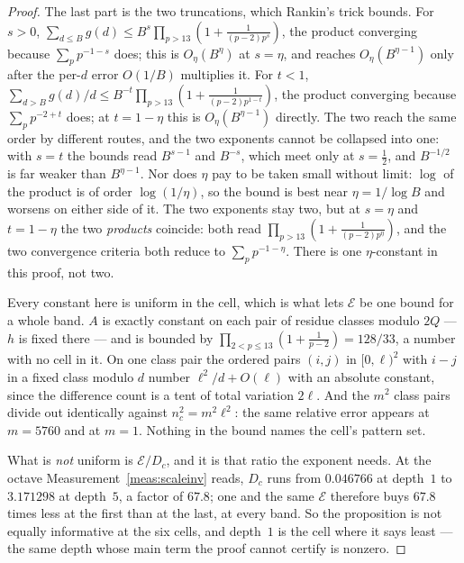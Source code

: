 \documentclass[11pt,a4paper]{article}
\theoremstyle{plain}
\theoremstyle{definition}
\theoremstyle{remark}
\begin{document}
\begin{proof}
The last part is the two truncations, which Rankin's trick bounds.
For $s>0$, $\sum_{d\le B}g(d)\le B^{s}\prod_{p>13}(1+\frac1{(p-2)p^{s}})$,
the product converging because $\sum_p p^{-1-s}$ does; this is
$O_\eta(B^{\eta})$ at $s=\eta$, and reaches $O_\eta(B^{\eta-1})$ only
after the per-$d$ error $O(1/B)$ multiplies it. For $t<1$,
$\sum_{d>B}g(d)/d\le B^{-t}\prod_{p>13}(1+\frac1{(p-2)p^{1-t}})$, the
product converging because $\sum_p p^{-2+t}$ does; at $t=1-\eta$ this
is $O_\eta(B^{\eta-1})$ directly. The two reach the same order by
different routes, and the two exponents cannot be collapsed into one:
with $s=t$ the bounds read $B^{s-1}$ and $B^{-s}$, which meet only at
$s=\tfrac12$, and $B^{-1/2}$ is far weaker than $B^{\eta-1}$. Nor does
$\eta$ pay to be taken small without limit: $\log$ of the product is
of order $\log(1\!/\!\eta)$, so the bound is best near
$\eta=1/\!\log B$ and worsens on either side of it. The two exponents
stay two, but at $s=\eta$ and $t=1-\eta$ the two \emph{products}
coincide: both read $\prod_{p>13}(1+\frac1{(p-2)p^{\eta}})$, and the
two convergence criteria both reduce to $\sum_p p^{-1-\eta}$. There is
one $\eta$-constant in this proof, not two.

Every constant here is uniform in the cell, which is what lets
$\mathcal E$ be one bound for a whole band. $A$ is exactly constant on
each pair of residue classes modulo $2Q$ --- $h$ is fixed there --- and
is bounded by $\prod_{2<p\le13}(1+\frac1{p-2})=128/33$, a number with
no cell in it. On one class pair the ordered pairs $(i,j)$ in
$[0,\ell)^2$ with $i-j$ in a fixed class modulo $d$ number
$\ell^2/d+O(\ell)$ with an absolute constant, since the difference
count is a tent of total variation $2\ell$. And the $m^2$ class pairs
divide out identically against $n_c^2=m^2\ell^2$: the same relative
error appears at $m=5760$ and at $m=1$. Nothing in the bound names the
cell's pattern set.

What is \emph{not} uniform is $\mathcal E/D_c$, and it is that ratio
the exponent needs. At the octave Measurement~\ref{meas:scaleinv}
reads, $D_c$ runs from $0.046766$ at depth~$1$ to $3.171298$ at
depth~$5$, a factor of $67.8$; one and the same $\mathcal E$ therefore
buys $67.8$ times less at the first than at the last, at every band.
So the proposition is not equally informative at the six cells, and
depth~$1$ is the cell where it says least --- the same depth whose main
term the proof cannot certify is nonzero.


\end{proof}
\end{document}
